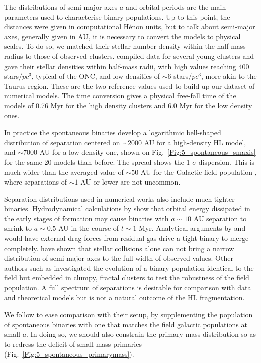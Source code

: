 The distributions of semi-major axes $a$ and orbital  periods are the main parameters used to 
characterise binary populations. Up to this point, the distances were given in  computational H\'enon units, but to talk about semi-major axes, generally given in AU, it is necessary to convert the models to physical scales. To do so, we matched their stellar number density within the half-mass radius to those of observed clusters.  \cite{King2012a}  compiled  data for several young clusters and gave their stellar densities within half-mass radii, with high values reaching  400 stars$/pc^3$, typical of the ONC, and low-densities  of $\sim 6$ stars$/pc^3$, more akin to the Taurus region. These are the two reference values used to build up our dataset of numerical models. The time conversion gives a physical free-fall time of the models of 0.76 Myr for the high density clusters and 6.0 Myr for the low density ones.



In practice the spontaneous binaries develop a logarithmic bell-shaped  distribution of separation centered on $\sim 2000$ AU for a high-density HL model,  and $\sim 7000$ AU for a low-density one, shown on Fig.~\ref{Fig:5_spontaneous_smaxis} for the same 20 models than before. The spread shows the 1-$\sigma$ dispersion. This is much wider than the averaged value of $\sim 50$ AU for the Galactic field population \citep{DM91,Raghavan2010}, where separations of $\sim 1 $ AU or lower are not uncommon.

Separation distributions used in numerical works also include much tighter binaries. Hydrodynamical calculations by \cite{Bate2012} show that orbital energy dissipated in the early stages of formation may cause binaries with $ a \sim 10 $ AU  separation to shrink to $ a \sim  0.5 $ AU in the course of $t \sim 1 $ Myr. Analytical arguments by \cite{Stahler2010} and \cite{Korntreff2012} would have external drag forces from residual gas drive a tight binary to merge completely. \cite{Kroupa2001} have shown that stellar collisions  alone can not bring a narrow distribution of semi-major axes to the full width of observed values. Other authors such as \cite{Parker2014} investigated the evolution of a binary population identical to the field but embedded in clumpy, fractal clusters \citep{Goodwin2004} to test the robustness of the field population. 
A full spectrum of separations is desirable for comparison with data and theoretical models but is not a  natural outcome of the HL fragmentation. 

We follow \cite{Parker2014} to ease comparison with their setup, by supplementing the population of spontaneous binaries with one that matches the field galactic populations at small $a$. 
In doing so, we should also constrain the primary mass distribution so as to redress the deficit of small-mass primaries (Fig.~\ref{Fig:5_spontaneous_primarymass}).




